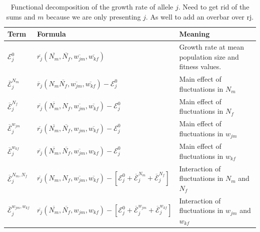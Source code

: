 \documentclass[12pt]{article}
\begin{document}
\begin{table}[h]
\fontsize{7}{12}\selectfont %
    \centering
      \caption{Functional decomposition of the growth rate of allele $j$. Need to get rid of the sums and $m$ because we are only presenting $j$. As well to add an overbar over rj. }
  \resizebox{\textwidth}{!} {\begin{tabular}{l|l|l}
  \toprule
        Term & Formula & Meaning \\
        \hline
         $\mathcal{E}^{0}_{j}$ & $\overline{r_{j}} (\overline{N_{m}}, \overline{N_{f}}, \overline{w_{jm}}, \overline{w_{kf}})$ & Growth rate at mean population size and fitness values. \\


         $\overline{\mathcal{E}}^{N_{m}}_{j}$ & $\overline{r}_{j}(N_{m} \overline{N_{f}}, \overline{w_{jm}}, \overline{w_{kf}}) - \mathcal{E}^{0}_{j} $ & Main effect of fluctuations in $N_{m}$\\

         $\overline{\mathcal{E}}^{N_{f}}_{j}$ & $ \overline{r_{j}}( \overline{N_{m}}, N_{f},\overline{w_{jm}}, \overline{w_{kf}}) - \mathcal{E}^{0}_{j}$ & Main effect of fluctuations in $N_{f}$ \\

        $\overline{\mathcal{E}}^{w_{jm}}_{j}$ & $ \overline{r_{j}}(\overline{N_{m}}, \overline{N_{f}}, w_{jm}, \overline{w_{kf}}) - \mathcal{E}^{0}_{j}$& Main effect of fluctuations in $w_{jm}$\\

        $\overline{\mathcal{E}}^{w_{kf}}_{j}$ & $ \overline{r_{j}}(\overline{N_{m}}, \overline{N_{f}}, \overline{w_{jm}}, w_{kf})- \mathcal{E}^{0}_{j}$ & Main effect of fluctuations in $w_{kf}$\\

        $\overline{\mathcal{E}}^{N_{m},N_{f}}_{j}$ & $ \overline{r_{j}}(N_{m}, N_{f}, \overline{w_{jm}}, \overline{w_{kf}})- [\mathcal{E}^{0}_{j} +\overline{\mathcal{E}}^{N_{m}}_{j}+\overline{\mathcal{E}}^{N_{f}}_{j}]$ & Interaction of fluctuations in $N_{m}$ and $N_{f}$\\

        $\overline{\mathcal{E}}^{w_{jm},w_{kf}}_{j}$ & $ \overline{r_{j}}(\overline{N_{m}}, \overline{N_{f}}, w_{jm}, w_{kf})- [\mathcal{E}^{0}_{j} +\overline{\mathcal{E}}^{w_{jm}}_j+\overline{\mathcal{E}}^{w_{kf}}_{j}]$ & Interaction of fluctuations in $w_{jm}$ and $w_{kf}$ \\


\end{tabular}}
\end{table}
\end{document}
